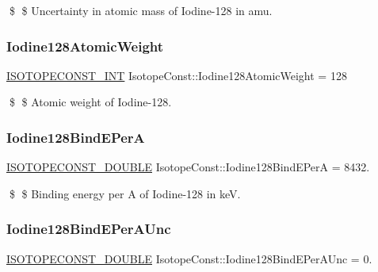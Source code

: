 \$ \$ Uncertainty in atomic mass of Iodine-\/128 in amu. \mbox{\label{group___isotope_const-_iodine-_i128_gaeceaf87c438acd5b28fbcb6d3d08fbc3}} 
\subsubsection{\texorpdfstring{Iodine128\+Atomic\+Weight}{Iodine128AtomicWeight}}
{\footnotesize\ttfamily \mbox{\hyperlink{group___isotope_const-_macros_ga5f18360b3e99483a35c32d789e62621c}{I\+S\+O\+T\+O\+P\+E\+C\+O\+N\+S\+T\+\_\+\+I\+NT}} Isotope\+Const\+::\+Iodine128\+Atomic\+Weight = 128}

\$ \$ Atomic weight of Iodine-\/128. \mbox{\label{group___isotope_const-_iodine-_i128_gad2bb61a5c68c9ecef3f3444a5e594c6c}} 
\subsubsection{\texorpdfstring{Iodine128\+Bind\+E\+PerA}{Iodine128BindEPerA}}
{\footnotesize\ttfamily \mbox{\hyperlink{group___isotope_const-_macros_ga8f45a7272ce02c0b4c65c44636ed719a}{I\+S\+O\+T\+O\+P\+E\+C\+O\+N\+S\+T\+\_\+\+D\+O\+U\+B\+LE}} Isotope\+Const\+::\+Iodine128\+Bind\+E\+PerA = 8432.}

\$ \$ Binding energy per A of Iodine-\/128 in keV. \mbox{\label{group___isotope_const-_iodine-_i128_ga51d0b5874796eb53bc7f9ef9aac3bb8b}} 
\subsubsection{\texorpdfstring{Iodine128\+Bind\+E\+Per\+A\+Unc}{Iodine128BindEPerAUnc}}
{\footnotesize\ttfamily \mbox{\hyperlink{group___isotope_const-_macros_ga8f45a7272ce02c0b4c65c44636ed719a}{I\+S\+O\+T\+O\+P\+E\+C\+O\+N\+S\+T\+\_\+\+D\+O\+U\+B\+LE}} Isotope\+Const\+::\+Iodine128\+Bind\+E\+Per\+A\+Unc = 0.}

